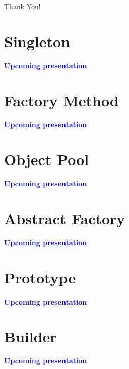 \documentclass[13pt]{beamer}
\begin{document}
\begin{frame}%
\begin{center}
{\fontsize{40}{50}\selectfont Thank You!}
\end{center}
\end{frame}

\section{Singleton}
\begin{frame}
\begin{center}
\textcolor{blue}{\textbf{Upcoming presentation}}
\end{center}
\end{frame}

\section{Factory Method}
\begin{frame}
\begin{center}
\textcolor{blue}{\textbf{Upcoming presentation}}
\end{center}
\end{frame}

\section{Object Pool}
\begin{frame}
\begin{center}
\textcolor{blue}{\textbf{Upcoming presentation}}
\end{center}
\end{frame}

\section{Abstract Factory}
\begin{frame}
\begin{center}
\textcolor{blue}{\textbf{Upcoming presentation}}
\end{center}
\end{frame}

\section{Prototype}
\begin{frame}
\begin{center}
\textcolor{blue}{\textbf{Upcoming presentation}}
\end{center}
\end{frame}

\section{Builder}
\begin{frame}
\begin{center}
\textcolor{blue}{\textbf{Upcoming presentation}}
\end{center}
\end{frame}
\end{document}
